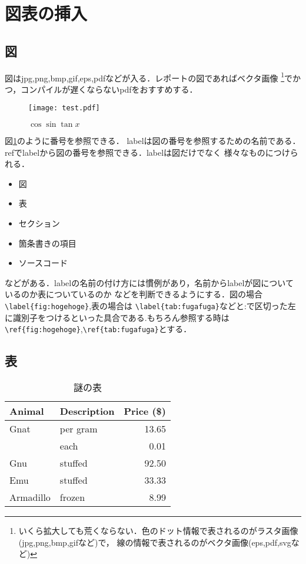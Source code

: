 \documentclass[a4j,titlepage,dvipdfmx,uplatex]{jsarticle}   %
\begin{document}
  \section{図表の挿入}
  \subsection{図}
  図はjpg,png,bmp,gif,eps,pdfなどが入る．レポートの図であればベクタ画像%
  \footnote{いくら拡大しても荒くならない．色のドット情報で表されるのがラスタ画像(jpg,png,bmp,gifなど)で，
  線の情報で表されるのがベクタ画像(eps,pdf,svgなど)}でかつ，コンパイルが遅くならないpdfをおすすめする．
  \begin{figure}[H]
    \centering
    \texttt{[image: test.pdf]}
    \caption{$\cos\sin\tan x$}
    \label{fig:tri}
  \end{figure}
  図\ref{fig:tri}のように番号を参照できる．
  labelは図の番号を参照するための名前である．refでlabelから図の番号を参照できる．labelは図だけでなく
  様々なものにつけられる．
  \begin{itemize}
    \item 図
    \item 表
    \item セクション
    \item 箇条書きの項目
    \item ソースコード
  \end{itemize}
  などがある．labelの名前の付け方には慣例があり，名前からlabelが図についているのか表についているのか
  などを判断できるようにする．図の場合\verb|\label{fig:hogehoge}|,表の場合は
  \verb|\label{tab:fugafuga}|などと:で区切った左に識別子をつけるといった具合である.もちろん参照する時は
  \verb|\ref{fig:hogehoge}|,\verb|\ref{tab:fugafuga}|とする．

  \subsection{表}
  \begin{table}[H]
    \centering
    \caption{謎の表}
    \label{tab:testTab}
    \begin{tabular}{|l|l|r|}
      \hline
      Animal      & Description  & Price (\$) \\ \hline
      Gnat        & per gram     & 13.65      \\ \hline
                  & each         & 0.01       \\ \hline
      Gnu         & stuffed      & 92.50      \\ \hline
      Emu         & stuffed      & 33.33      \\ \hline
      Armadillo   & frozen       & 8.99       \\ \hline
    \end{tabular}
  \end{table}
\end{document}

